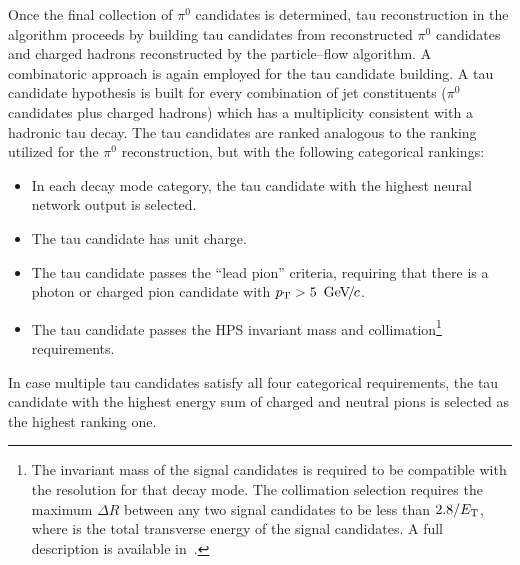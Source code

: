 Once the final collection of $\pi^0$ candidates is determined, tau
reconstruction in the \hpsTanc algorithm proceeds by building tau candidates
from reconstructed $\pi^0$ candidates and charged hadrons reconstructed by the
particle--flow algorithm.  A combinatoric approach is again employed for the tau
candidate building.  A tau candidate hypothesis is built for every combination
of jet constituents ($\pi^0$ candidates plus charged hadrons) which has a
multiplicity consistent with a hadronic tau decay.  The tau candidates are
ranked analogous to the ranking utilized for the $\pi^0$ reconstruction, but
with the following categorical rankings:
\begin{itemize}
\item In each decay mode category, the tau candidate with the highest neural network output is selected.
\item The tau candidate has unit charge.
\item The tau candidate passes the ``lead pion'' criteria, requiring that there
  is a photon or charged pion candidate with $p_{\mathrm{T}} > 5~{\,\text{Ge\hspace{-.08em}V\hspace{-0.16em}/\hspace{-0.08em}}c}$.
\item The tau candidate passes the HPS invariant mass and 
  collimation\footnote{The invariant mass of the signal candidates is required
  to be compatible with the resolution for that decay mode.  The collimation
  selection requires the maximum $\Delta R$ between any two signal candidates to
  be less than $2.8/E_{\mathrm{T}}$, where \et is the total transverse energy of the signal
  candidates.  A full description is available in~\cite{CMS_AN_2010-082}.}
  requirements.
\end{itemize}  
In case multiple tau candidates satisfy all four categorical requirements,  the
tau candidate with the highest energy sum of charged and neutral pions is
selected as the highest ranking one.

